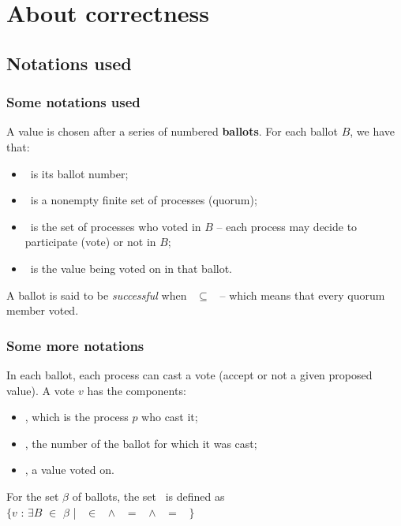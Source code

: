 \documentclass[10 pt]{beamer}
\begin{document}
\section{About correctness}

\subsection{Notations used}


\begin{frame}
  \frametitle{Some notations used}
  
  A value is chosen after a series of numbered \textbf{ballots}. For each ballot $B$, we have that:
  \begin{itemize}
    \item \bbal\ is its ballot number; %
    \item \bqrm\ is a nonempty finite set of processes (quorum);
    \item \bvot\ is the set of processes who voted in $B$ -- each process may decide to participate (vote) or not in $B$;
    \item \bval\ is the value being voted on in that ballot.
  \end{itemize}
  
  \vspace{4 mm}
  A ballot is said to be \emph{successful} when \bqrm\ $\subseteq$ \bvot\ -- which means that every quorum member voted.

\end{frame}

\begin{frame}
  \frametitle{Some more notations}
  
  In each ballot, each process can cast a vote (accept or not a given proposed value). A vote $v$ has the components:

  \begin{itemize}
    \item \vp, which is the process $p$ who cast it;
    \item \vbal, the number of the ballot for which it was cast;
    \item \vval, a value voted on.
  \end{itemize}
  
  \vspace{4 mm}
 For the set $\beta$ of ballots, the set \votesbeta\ is defined as\\
 $\{v$ : $\exists B$ $\in$ $\beta$ | \vp\ $\in$ \bvot\ $\wedge$ \vbal\ $=$ \bbal\ $\wedge$ \vval\ $=$ \bval\ $\}$ 

\end{frame}
\end{document}
